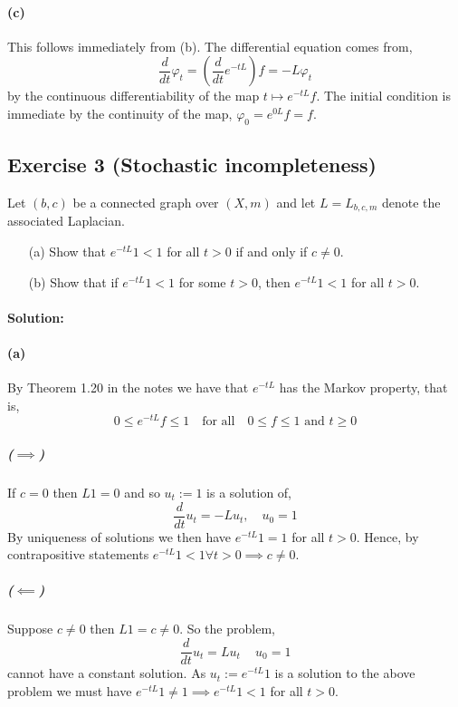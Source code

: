 \paragraph{(c)}
This follows immediately from (b). The differential equation comes from,
\begin{equation*}
	\frac{d}{dt}\varphi_{t} = \left(\frac{d}{dt}e^{-tL}\right)f = -L\varphi_{t}
\end{equation*}
by the continuous differentiability of the map $t\mapsto e^{-tL}f$. The initial condition is immediate by the continuity of the map, $\varphi_{0} = e^{0L}f = f$.

\subsection{Exercise 3 (Stochastic incompleteness)}

Let $(b,c)$ be a connected graph over $(X,m)$ and let $L=L_{b,c,m}$ denote the associated Laplacian.
\begin{itemize}
	\item [(a)]
		Show that $e^{-tL}1<1$ for all $t>0$ if and only if $c\neq 0$.
	\item [(b)]
		Show that if $e^{-tL}1<1$ for some $t>0$, then $e^{-tL}1<1$ for all $t>0$.
\end{itemize}

\paragraph{Solution:}

\paragraph{(a)}
By Theorem 1.20 in the notes we have that $e^{-tL}$ has the Markov property, that is,
\begin{equation*}
	0\leq e^{-tL}f\leq 1 \quad \text{for all} \quad 0\leq f\leq 1\text{ and }t\geq 0
\end{equation*}

\subparagraph{($\implies$)}
If $c=0$ then $L1=0$ and so $u_{t}:=1$ is a solution of,
\begin{equation*}
	\frac{d}{dt}u_{t} = -Lu_{t},\quad u_{0} = 1
\end{equation*}
By uniqueness of solutions we then have $e^{-tL}1 = 1$ for all $t>0$. Hence, by contrapositive statements $e^{-tL}1 < 1 \forall t>0\implies c\neq 0$.

\subparagraph{($\impliedby$)}
Suppose $c\neq 0$ then $L1=c\neq 0$. So the problem,
\begin{equation*}
	\frac{d}{dt}u_{t} = Lu_{t}\,\quad u_{0}=1
\end{equation*}
cannot have a constant solution. As $u_{t}:=e^{-tL}1$ is a solution to the above problem we must have $e^{-tL}1\neq 1\implies e^{-tL}1<1$ for all $t>0$.

